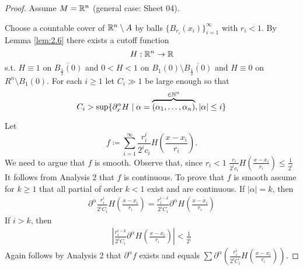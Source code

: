 \begin{proof}
    Assume \(M=\mathbb{R}^n\) (general case: Sheet 04).

    Choose a countable cover of \(\mathbb{R}^n\setminus A\) by balls \(\{B_{r_i}(x_i)\}_{i=1}^\infty\) with \(r_i<1\).
    By Lemma \ref{lem:2.6} there exists a cutoff function \[H:\mathbb{R}^n\to \mathbb{R}\]
    s.t. \(H\equiv 1\) on \(\overline{B_{\frac{1}{2}}(0)}\) and \(0<H<1\) on \(B_1(0)\setminus \overline{B_{\frac{1}{2}}(0)}\)
    and \(H\equiv 0\) on \(R^n\setminus B_1(0)\). For each \(i\geq 1\) let \(C_i\gg 1\) be large enough so that 
    \[C_i>\sup \{\partial^\alpha_x H \mid \alpha=\overbrace{(\alpha_1,\dots,\alpha_n)}^{\in \mathbb{N}^n},|\alpha|\leq i\}\]  

    Let \[f\coloneqq \sum_{i=1}^\infty \frac{r_i^i}{2^i c_i}H\left(\frac{x-x_i}{r_i}\right).\]
    We need to argue that \(f\) is smooth. Observe that, since \(r_i<1\) \(\frac{r_i}{2^ic_i}H\left(\frac{x-x_i}{r_i}\right)\leq \frac{1}{2^i}\)
    It follows from Analysis 2 that \(f\) is continuous. To prove that \(f\) is smooth assume for \(k\geq 1\)  
    that all partial of order \(k<1\) exist and are continuous. If \(|\alpha|=k\), then \begin{align*}
        \partial^\alpha\frac{r_i^i}{2^iC_i} H\left(\frac{x-x_i}{r_i}\right)=\frac{r_i^{i-k}}{2^iC_i}\partial^\alpha H \left(\frac{x-x_i}{r_i}\right)
    \end{align*}
    If \(i>k\), then 
    \begin{align*}
        \left\vert \frac{r_i^{i-k}}{2^iC_i} \partial^\alpha  H \left(\frac{x-x_i}{r_i}\right)\right\vert<\frac{1}{2^i}
    \end{align*}
    Again follows by Analysis 2 that \(\partial^\alpha f\) exists and equals \(\sum\partial^\alpha \left(\frac{r_i^i}{2^iC_i}H\left(\frac{x-x_i}{r_i}\right) \right)\).
\end{proof}